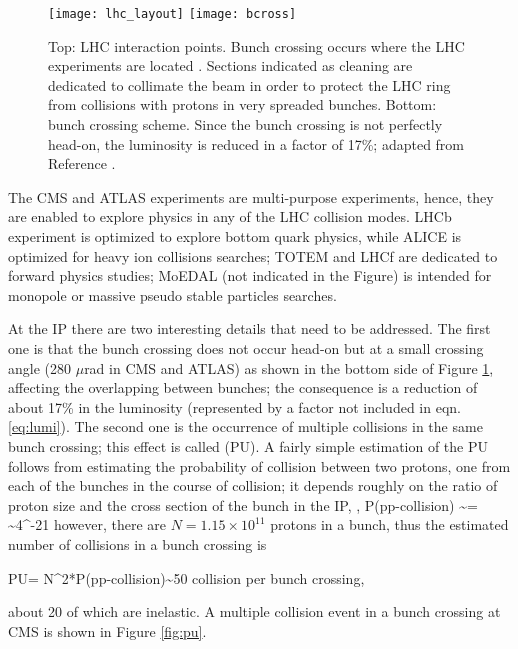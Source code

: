 \begin{figure}[!h]
\centering
\texttt{[image: lhc\_layout]}
\texttt{[image: bcross]}
\caption [LHC interaction points]{Top: LHC interaction points. Bunch crossing occurs where the LHC experiments are located \cite{lhc_layout}. Sections indicated as cleaning are dedicated to collimate the beam in order to protect the LHC ring from collisions with protons in very spreaded bunches. Bottom: bunch crossing scheme. Since the bunch crossing is not perfectly head-on, the luminosity is reduced in a factor of 17\%; adapted from Reference \cite{l1}.}\label{fig:lhc_layout}
\end{figure}

The CMS and ATLAS experiments are multi-purpose experiments, hence, they are enabled to explore physics in any of the LHC collision modes. LHCb experiment is optimized to explore bottom quark physics, while ALICE is optimized for heavy ion collisions searches; TOTEM and LHCf are dedicated to forward physics studies; MoEDAL (not indicated in the Figure) is intended for monopole or massive pseudo stable particles searches.

At the IP there are two interesting details that need to be addressed. The first one is that the bunch crossing does not occur head-on but at a small crossing angle  (280 $\mu$rad in CMS and ATLAS) as shown in the bottom side of Figure \ref{fig:lhc_layout}, affecting the overlapping between bunches; the consequence is a reduction of about 17\% in the luminosity (represented by a factor not included in eqn. \ref{eq:lumi}). The second one is the occurrence of multiple \pp collisions in the same bunch crossing; this effect is called  (PU). A fairly simple estimation of the PU follows from estimating the probability of collision between two protons, one from each of the bunches in the course of collision; it depends roughly on the ratio of proton size and the cross section of the bunch in the IP, \ie,
\beqn
P(pp-collision) \sim {}= \sim 4^{-21}
\eeqn
\noindent however, there are $N=1.15\times 10^{11}$ protons in a bunch, thus the estimated number of collisions in a bunch crossing is

\beqn
PU= N^2*P(pp-collision)\sim 50  \textrm{\pp collision per bunch crossing},
\eeqn

\noindent about 20 of which are inelastic. %
A multiple \pp collision event in a bunch crossing at CMS is shown in Figure \ref{fig:pu}. %

